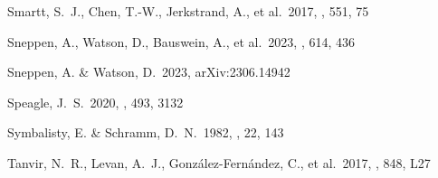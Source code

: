 \documentclass[twocolumn,twocolappendix]{aastex63}
\begin{document}
{\begin{thebibliography}{}


 Smartt, S.~J., Chen, T.-W., Jerkstrand, A., et al.\ 2017, \nat, 551, 75



 Sneppen, A., Watson, D., Bauswein, A., et al.\ 2023, \nat, 614, 436


 Sneppen, A. \& Watson, D.\ 2023, arXiv:2306.14942








 Speagle, J.~S.\ 2020, \mnras, 493, 3132

 Symbalisty, E. \& Schramm, D.~N.\ 1982, \aplett, 22, 143












 Tanvir, N.~R., Levan, A.~J., Gonz{\'a}lez-Fern{\'a}ndez, C., et al.\ 2017, \apjl, 848, L27



\end{thebibliography}}
\end{document}
